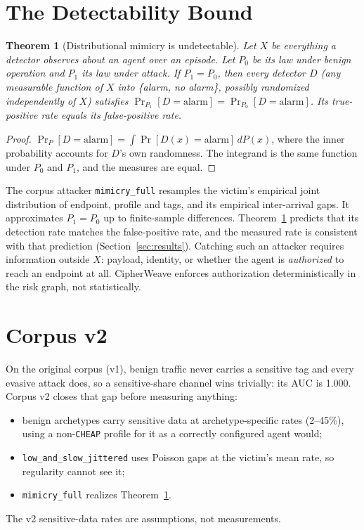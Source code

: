 \documentclass[conference]{IEEEtran}
\newtheorem{theorem}{Theorem}
\theoremstyle{remark}
\begin{document}
\section{The Detectability Bound}\label{sec:bound}
\begin{theorem}[Distributional mimicry is undetectable]\label{thm:bound}
Let $X$ be everything a detector observes about an agent over an episode. Let $P_0$ be its law under benign operation and $P_1$ its law under attack. If $P_1=P_0$, then every detector $D$ (any measurable function of $X$ into \{alarm, no alarm\}, possibly randomized independently of $X$) satisfies $\Pr_{P_1}[D=\text{alarm}]=\Pr_{P_0}[D=\text{alarm}]$. Its true-positive rate equals its false-positive rate.
\end{theorem}
\begin{proof}
$\Pr_{P}[D=\text{alarm}]=\int \Pr[D(x)=\text{alarm}]\,dP(x)$, where the inner probability accounts for $D$'s own randomness. The integrand is the same function under $P_0$ and $P_1$, and the measures are equal.
\end{proof}
The corpus attacker \texttt{mimicry\_full} resamples the victim's empirical joint distribution of endpoint, profile and tags, and its empirical inter-arrival gaps. It approximates $P_1=P_0$ up to finite-sample differences. Theorem~\ref{thm:bound} predicts that its detection rate matches the false-positive rate, and the measured rate is consistent with that prediction (Section~\ref{sec:results}). Catching such an attacker requires information outside $X$: payload, identity, or whether the agent is \emph{authorized} to reach an endpoint at all. CipherWeave enforces authorization deterministically in the risk graph, not statistically.

\section{Corpus v2}\label{sec:v2}
On the original corpus (v1), benign traffic never carries a sensitive tag and every evasive attack does, so a sensitive-share channel wins trivially: its AUC is 1.000. Corpus v2 closes that gap before measuring anything:
\begin{itemize}
\item benign archetypes carry sensitive data at archetype-specific rates (2--45\%), using a non-\texttt{CHEAP} profile for it as a correctly configured agent would;
\item \texttt{low\_and\_slow\_jittered} uses Poisson gaps at the victim's mean rate, so regularity cannot see it;
\item \texttt{mimicry\_full} realizes Theorem~\ref{thm:bound}.
\end{itemize}
The v2 sensitive-data rates are assumptions, not measurements.
\end{document}
